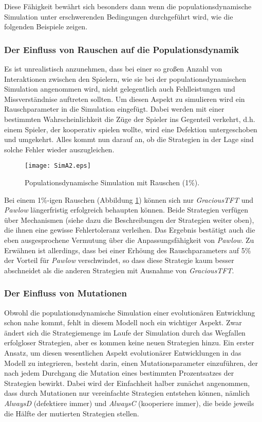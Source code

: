 \documentclass[12pt,a4paper,ngerman]{article}
\begin{document}
Diese Fähigkeit bewährt sich besonders dann wenn die
populationsdynamische Simulation unter erschwerenden Bedingungen
durchgeführt wird, wie die folgenden Beispiele zeigen.

\subsubsection{Der Einfluss von Rauschen auf die Populationsdynamik}

Es ist unrealistisch anzunehmen, dass bei einer so großen Anzahl von
Interaktionen zwischen den Spielern, wie sie bei der
populationsdynamischen Simulation angenommen wird, nicht gelegentlich
auch Fehlleistungen und Missverständnise auftreten sollten. Um diesen
Aspekt zu simulieren wird ein Rauschparameter in die Simulation
eingefügt. Dabei werden mit einer bestimmten Wahrscheinlichkeit die
Züge der Spieler ins Gegenteil verkehrt, d.h. einem Spieler, der
kooperativ spielen wollte, wird eine Defektion untergeschoben und
umgekehrt. Alles kommt nun darauf an, ob die Strategien in der Lage
sind solche Fehler wieder auszugleichen.

\begin{figure}
\begin{center}
\texttt{[image: SimA2.eps]}
\caption{\label{SimA2} {\small Populationsdynamische Simulation mit Rauschen (1\%).}}
\end{center}
\end{figure}

Bei einem 1\%-igen Rauschen (Abbildung \ref{SimA2}) können sich nur
{\em GraciousTFT} und {\em Pawlow} längerfristig erfolgreich behaupten
können. Beide Strategien verfügen über Mechanismen (siehe dazu die
Beschreibungen der Strategien weiter oben), die ihnen eine gewisse
Fehlertoleranz verleihen. Das Ergebnis bestätigt auch die eben
ausgesprochene Vermutung über die Anpassungsfähigkeit von {\em
  Pawlow}. Zu Erwähnen ist allerdings, dass bei einer Erhöung des
Rauschparameters auf 5\% der Vorteil für {\em Pawlow} verschwindet, so
dass diese Strategie kaum besser abschneidet als die anderen
Strategien mit Ausnahme von {\em GraciousTFT}.

\subsubsection{Der Einfluss von Mutationen}

Obwohl die populationsdynamische Simulation einer evolutionären
Entwicklung schon nahe kommt, fehlt in diesem Modell noch ein
wichtiger Aspekt. Zwar ändert sich die Strategiemenge im Laufe der
Simulation durch das Wegfallen erfolgloser Strategien, aber es kommen
keine neuen Strategien hinzu. Ein erster Ansatz, um diesen
wesentlichen Aspekt evolutionärer Entwicklungen in das Modell zu
integrieren, besteht darin, einen Mutationsparameter einzuführen, der
nach jedem Durchgang die Mutation eines bestimmten Prozentsatzes der
Strategien bewirkt. Dabei wird der Einfachheit halber zunächst
angenommen, dass durch Mutationen nur vereinfachte Strategien
entstehen können, nämlich {\em AlwaysD} (defektiere immer) und {\em
  AlwaysC} (kooperiere immer), die beide jeweils die Hälfte der
mutierten Strategien stellen.
\end{document}
